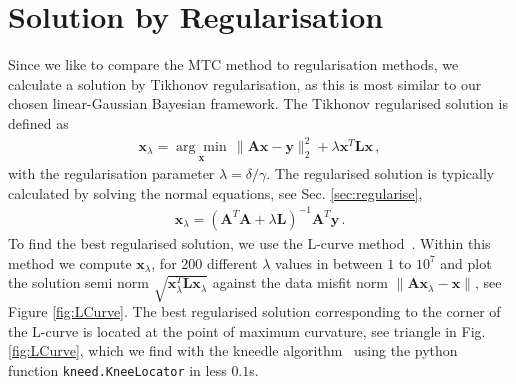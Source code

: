 \section{Solution by Regularisation}
\label{sec:reg}
Since we like to compare the MTC method to regularisation methods, we calculate a solution by Tikhonov regularisation, as this is most similar to our chosen linear-Gaussian Bayesian framework.
The Tikhonov regularised solution is defined as~\cite{hansen2010discrete} 
\begin{align}
	\bm{x}_{\lambda} =\underset{ \bm{x}}{\arg \min}\,  \lVert \bm{A}\bm{x} - \bm{y} \rVert_2^2 + \lambda \bm{x}^T \bm{L} \bm{x} \, ,
	\label{eq:XLam}
\end{align}
with the regularisation parameter $\lambda = \delta / \gamma$.
The regularised solution is typically calculated by solving the normal equations, see Sec. \ref{sec:regularise},
\begin{align}
	\bm{x}_{\lambda} = (\bm{A}^T\bm{A} + \lambda \bm{L} )^{-1} \bm{A}^T \bm{y} \label{eq:xLam} \, .
\end{align}
To find the best regularised solution, we use the L-curve method~\cite{hansen1993use}.
Within this method we compute $\bm{x}_\lambda$, for 200 different $\lambda$ values in between $1$ to $10^7$ and plot the solution semi norm $\sqrt{\bm{x}_\lambda^T\mathbf{L} \bm{x}_\lambda}$ against the data misfit norm $\lVert \bm{A}\bm{x}_\lambda - \bm{x} \rVert$, see Figure \ref{fig:LCurve}. 
The best regularised solution corresponding to the corner of the L-curve is located at the point of maximum curvature, see triangle in Fig. \ref{fig:LCurve}, which we find with the kneedle algorithm~\cite{satopaa2011kneedle} using the python function \texttt{kneed.KneeLocator} in less $0.1$s.


